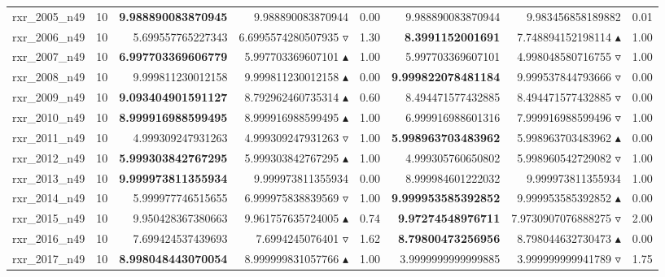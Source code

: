 \begin{table}[]
{\begin{tabular}{ll@{\hspace{1.2cm}}rrr@{\hspace{1.2cm}}rrr}
rxr_2005_n49 & 10 & \textbf{9.988890083870945} & 9.988890083870944 \phantom{$\blacktriangle$} & 0.00 & 9.988890083870944 & 9.983456858189882 \phantom{$\blacktriangle$} & 0.01 \\
rxr_2006_n49 & 10 & 5.699557765227343 & 6.6995574280507935 $\triangledown$ & 1.30 & \textbf{8.3991152001691} & 7.748894152198114 $\blacktriangle$ & 1.00 \\
rxr_2007_n49 & 10 & \textbf{6.997703369606779} & 5.997703369607101 $\blacktriangle$ & 1.00 & 5.997703369607101 & 4.998048580716755 $\triangledown$ & 1.00 \\
rxr_2008_n49 & 10 & 9.999811230012158 & 9.999811230012158 $\blacktriangle$ & 0.00 & \textbf{9.999822078481184} & 9.999537844793666 $\triangledown$ & 0.00 \\
rxr_2009_n49 & 10 & \textbf{9.093404901591127} & 8.792962460735314 $\blacktriangle$ & 0.60 & 8.494471577432885 & 8.494471577432885 $\triangledown$ & 0.00 \\
rxr_2010_n49 & 10 & \textbf{8.999916988599495} & 8.999916988599495 $\blacktriangle$ & 1.00 & 6.999916988601316 & 7.999916988599496 $\triangledown$ & 1.00 \\
rxr_2011_n49 & 10 & 4.999309247931263 & 4.999309247931263 $\triangledown$ & 1.00 & \textbf{5.998963703483962} & 5.998963703483962 $\blacktriangle$ & 0.00 \\
rxr_2012_n49 & 10 & \textbf{5.999303842767295} & 5.999303842767295 $\blacktriangle$ & 1.00 & 4.999305760650802 & 5.998960542729082 $\triangledown$ & 1.00 \\
rxr_2013_n49 & 10 & \textbf{9.999973811355934} & 9.999973811355934 \phantom{$\blacktriangle$} & 0.00 & 8.999984601222032 & 9.999973811355934 \phantom{$\blacktriangle$} & 1.00 \\
rxr_2014_n49 & 10 & 5.999977746515655 & 6.999975838839569 $\triangledown$ & 1.00 & \textbf{9.999953585392852} & 9.999953585392852 $\blacktriangle$ & 0.00 \\
rxr_2015_n49 & 10 & 9.950428367380663 & 9.961757635724005 $\blacktriangle$ & 0.74 & \textbf{9.97274548976711} & 7.9730907076888275 $\triangledown$ & 2.00 \\
rxr_2016_n49 & 10 & 7.699424537439693 & 7.6994245076401 $\triangledown$ & 1.62 & \textbf{8.79800473256956} & 8.798044632730473 $\blacktriangle$ & 0.00 \\
rxr_2017_n49 & 10 & \textbf{8.998048443070054} & 8.999999831057766 $\blacktriangle$ & 1.00 & 3.9999999999999885 & 3.999999999941789 $\triangledown$ & 1.75 \\

\end{tabular}}
\end{table}
